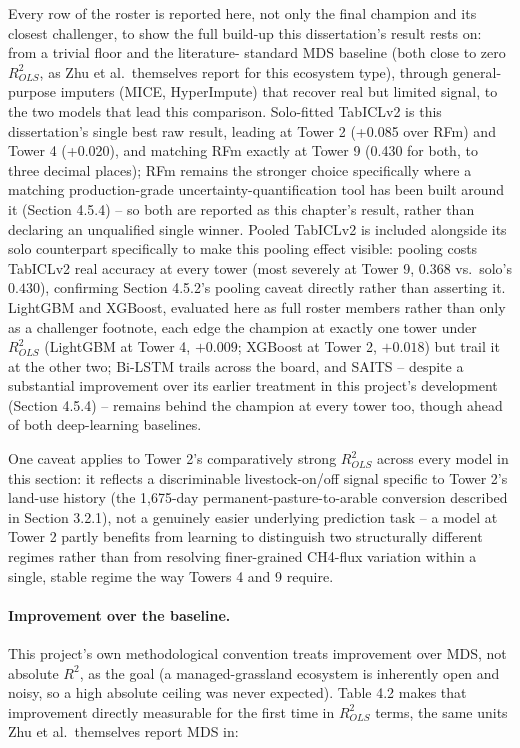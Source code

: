 Every row of the roster is reported here, not only the final champion and its closest challenger, to
show the full build-up this dissertation's result rests on: from a trivial floor and the literature-
standard MDS baseline (both close to zero $R^2_{OLS}$, as Zhu et al.\ themselves report for this
ecosystem type), through general-purpose imputers (MICE, HyperImpute) that recover real but limited
signal, to the two models that lead this comparison. Solo-fitted TabICLv2 is this dissertation's
single best raw result, leading at Tower 2 (+0.085 over RFm) and Tower 4 (+0.020), and matching RFm
exactly at Tower 9 (0.430 for both, to three decimal places); RFm remains the stronger choice
specifically where a matching production-grade uncertainty-quantification tool has been built around
it (Section 4.5.4) -- so both are reported as this chapter's result, rather than declaring an
unqualified single winner. Pooled TabICLv2 is included alongside its solo counterpart specifically
to make this pooling effect visible: pooling costs TabICLv2 real accuracy at every tower (most
severely at Tower 9, $0.368$ vs.\ solo's $0.430$), confirming Section 4.5.2's pooling caveat directly
rather than asserting it. LightGBM and XGBoost, evaluated here as full roster members rather than
only as a challenger footnote, each edge the champion at exactly one tower under $R^2_{OLS}$
(LightGBM at Tower 4, $+0.009$; XGBoost at Tower 2, $+0.018$) but trail it at the other two; Bi-LSTM
trails across the board, and SAITS -- despite a substantial improvement over its earlier treatment in
this project's development (Section 4.5.4) -- remains behind the champion at every tower too, though
ahead of both deep-learning baselines.

One caveat applies to Tower 2's comparatively strong $R^2_{OLS}$ across every model in this section:
it reflects a discriminable livestock-on/off signal specific to Tower 2's land-use history (the
1,675-day permanent-pasture-to-arable conversion described in Section 3.2.1), not a genuinely
easier underlying prediction task -- a model at Tower 2 partly benefits from learning to
distinguish two structurally different regimes rather than from resolving finer-grained
CH4-flux variation within a single, stable regime the way Towers 4 and 9 require.

\paragraph{Improvement over the baseline.} This project's own methodological convention treats
improvement over MDS, not absolute $R^2$, as the goal (a managed-grassland ecosystem is inherently
open and noisy, so a high absolute ceiling was never expected). Table 4.2 makes that improvement
directly measurable for the first time in $R^2_{OLS}$ terms, the same units Zhu et al.\ themselves
report MDS in:

